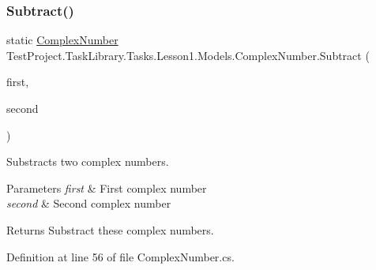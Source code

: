 \subsubsection{\texorpdfstring{Subtract()}{Subtract()}}
{\footnotesize\ttfamily static \mbox{\hyperlink{class_test_project_1_1_task_library_1_1_tasks_1_1_lesson1_1_1_models_1_1_complex_number}{Complex\+Number}} Test\+Project.\+Task\+Library.\+Tasks.\+Lesson1.\+Models.\+Complex\+Number.\+Subtract (\begin{DoxyParamCaption}\item[{\mbox{\hyperlink{class_test_project_1_1_task_library_1_1_tasks_1_1_lesson1_1_1_models_1_1_complex_number}{Complex\+Number}}}]{first,  }\item[{\mbox{\hyperlink{class_test_project_1_1_task_library_1_1_tasks_1_1_lesson1_1_1_models_1_1_complex_number}{Complex\+Number}}}]{second }\end{DoxyParamCaption})\hspace{0.3cm}{\ttfamily [static]}}



Substracts two complex numbers. 


\begin{DoxyParams}{Parameters}
{\em first} & First complex number\\
\hline
{\em second} & Second complex number\\
\hline
\end{DoxyParams}
\begin{DoxyReturn}{Returns}
Substract these complex numbers.
\end{DoxyReturn}


Definition at line 56 of file Complex\+Number.\+cs.

\mbox{\label{class_test_project_1_1_task_library_1_1_tasks_1_1_lesson1_1_1_models_1_1_complex_number_a3fe7a71ee46f96889f4aa099fb381f1f}} 

